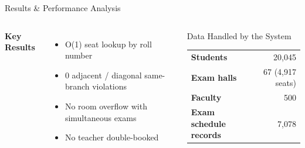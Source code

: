 \documentclass[aspectratio=169,11pt]{beamer}
\begin{document}
\begin{frame}{Results \& Performance Analysis}

\begin{columns}[T,totalwidth=\textwidth]


\textbf{\color{GEUBlue}Key Results}

\begin{itemize}\itemsep3pt
    \small
    \item O(1) seat lookup by roll number
    \item 0 adjacent / diagonal same-branch violations
    \item No room overflow with simultaneous exams
    \item No teacher double-booked
\end{itemize}


\begin{block}{Data Handled by the System}

\centering
\renewcommand{\arraystretch}{1.3}
\begin{tabular}{@{}lr@{}}
\textbf{Students} & 20,045\\
\textbf{Exam halls} & 67 (4,917 seats)\\
\textbf{Faculty} & 500\\
\textbf{Exam schedule records} & 7,078
\end{tabular}

\end{block}

\end{columns}

\end{frame}
\end{document}

